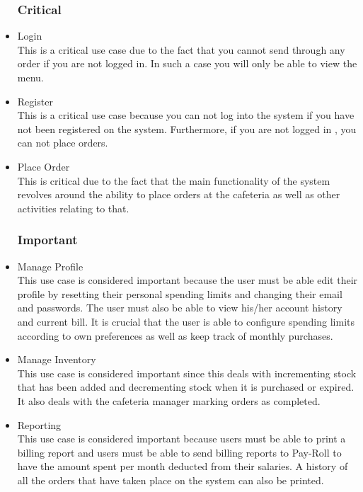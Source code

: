\documentclass[12pt]{article}
\begin{document}
\begin{itemize}

\subsubsection{Critical}
\item Login \\
This is a critical use case due to the fact that you cannot send through any order if you are not logged in. In such a case you will only be able to view the menu. 
 
\item Register \\
This is a critical use case because you can not log into the system if you have not been registered on the system. Furthermore, if you are not logged in , you can not place orders.

\item Place Order\\
This is critical due to the fact that the main functionality of the system revolves around the ability to place orders at the cafeteria as well as other activities relating to that. 

\subsubsection{Important}
\item Manage Profile \\
This use case is considered important because the user must be able edit their profile by resetting their personal spending limits and changing their email and passwords. The user must also be able to view his/her account history and current bill. It is crucial that the user is able to configure spending limits according to own preferences as well as keep track of monthly purchases.

\item Manage Inventory \\
This use case is considered important since this deals with incrementing stock that has been added and decrementing stock when it is purchased or expired. It also deals with the cafeteria manager marking orders as completed.

\item Reporting \\ 
This use case is considered important because users must be able to print a billing report and users must be able to send billing reports to Pay-Roll to have the amount spent per month deducted from their salaries. A history of all the orders that have taken place on the system can also be printed. 


\end{itemize}
\end{document}
